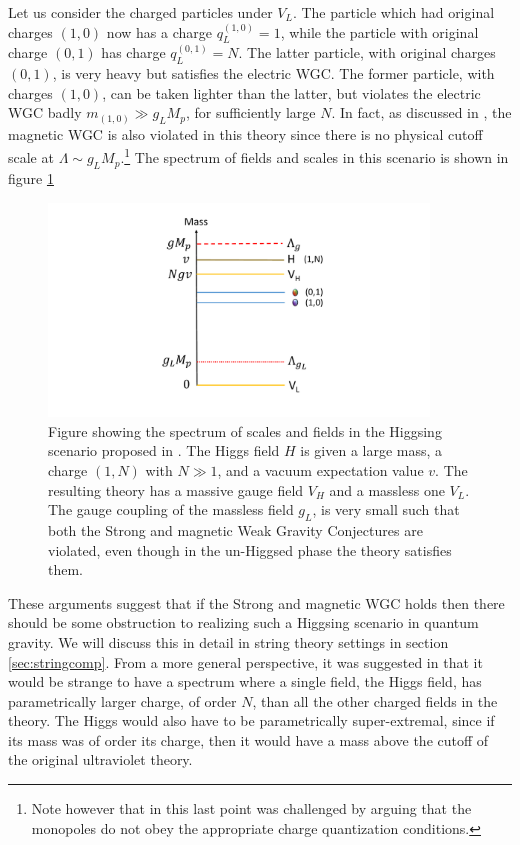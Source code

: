 \documentclass[11pt,a4paper]{article}
\numberwithin{equation}{section}
\numberwithin{table}{section}\setlength{\multlinegap}{25pt}
\begin{document}
Let us consider the charged particles under $V_L$. The particle which had original charges $\left(1,0\right)$ now has a charge $q^{(1,0)}_L = 1$, while the particle with original charge $\left(0,1\right)$ has charge $q^{(0,1)}_L = N$. The latter particle, with original charges $\left(0,1\right)$, is very heavy but satisfies the electric WGC. The former particle, with charges $\left(1,0\right)$, can be taken lighter than the latter, but violates the electric WGC badly $m_{(1,0)} \gg g_L M_p$, for sufficiently large $N$. In fact, as discussed in \cite{Saraswat:2016eaz}, the magnetic WGC is also violated in this theory since there is no physical cutoff scale at $\Lambda \sim g_L M_p$.\footnote{Note however that in \cite{Furuuchi:2017upe} this last point was challenged by arguing that the monopoles do not obey the appropriate charge quantization conditions.} The spectrum of fields and scales in this scenario is shown in figure \ref{fig:HSW}
\begin{figure}[t]
\centering
 \includegraphics[width=0.9\textwidth]{FigHSW.pdf}
\caption{Figure showing the spectrum of scales and fields in the Higgsing scenario proposed in \cite{Saraswat:2016eaz}. The Higgs field $H$ is given a large mass, a charge $\left(1,N\right)$ with $N \gg 1$, and a vacuum expectation value $v$. The resulting theory has a massive gauge field $V_H$ and a massless one $V_L$. The gauge coupling of the massless field $g_L$, is very small such that both the Strong and magnetic Weak Gravity Conjectures are violated, even though in the un-Higgsed phase the theory satisfies them.}
\label{fig:HSW}
\end{figure}


These arguments suggest that if the Strong and magnetic WGC holds then there should be some obstruction to realizing such a Higgsing scenario in quantum gravity. We will discuss this in detail in string theory settings in section \ref{sec:stringcomp}. From a more general perspective, it was suggested in \cite{Heidenreich:2017sim} that it would be strange to have a spectrum where a single field, the Higgs field, has parametrically larger charge, of order $N$, than all the other charged fields in the theory. The Higgs would also have to be parametrically super-extremal, since if its mass was of order its charge, then it would have a mass above the cutoff of the original ultraviolet theory.  
\end{document}
